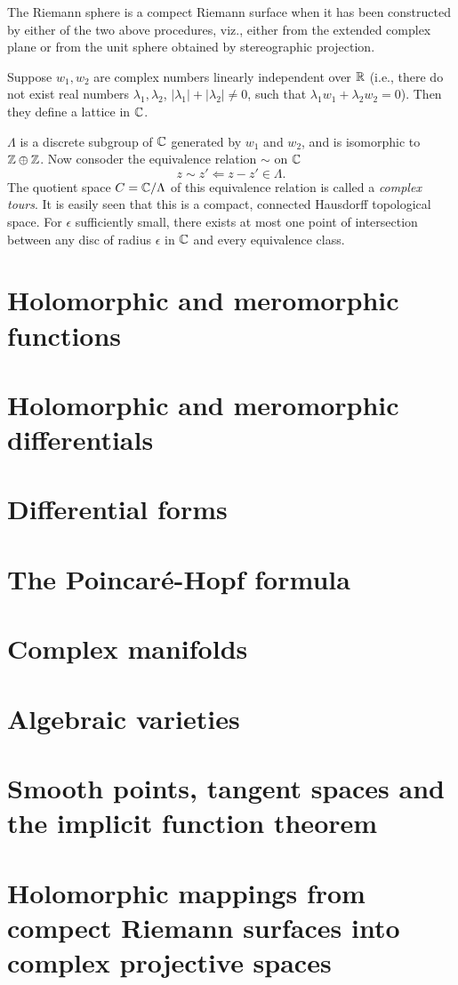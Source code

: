 \begin{example}[The set of extended complex numbers $\Sigma=\C\cup\{\infty\}$ (one point compactification of complex numbers)]
    The Riemann sphere is a compect Riemann surface when it has been constructed by either of the two above procedures, viz., either from the extended complex plane or from the unit sphere obtained by stereographic projection. 
\end{example}
\begin{example}
    Suppose $w_1,w_2$ are complex numbers linearly independent over $\mathbb{R}$ (i.e., there do not exist real numbers $\lambda_1,\lambda_2$, $|\lambda_1|+|\lambda_2|\neq0$, such that $\lambda_1w_1+\lambda_2w_2=0$). Then they define a lattice in $\mathbb{C}$. 

    $\Lambda$ is a discrete subgroup of $\mathbb{C}$ generated by $w_1$ and $w_2$, and is isomorphic to $\mathbb{Z}\oplus\mathbb{Z}$. Now consoder the equivalence relation $\sim$ on $\mathbb{C}$ 
    \[z\sim z'\Leftarrow z-z'\in\Lambda. \]
    The quotient space $C=\mathbb{C}/\Lambda$ of this equivalence relation is called a \textit{complex tours}. It is easily seen that this is a compact, connected Hausdorff topological space. For $\epsilon$ sufficiently small, there exists at most one point of intersection between any disc of radius $\epsilon$ in $\mathbb{C}$ and every equivalence class. 
\end{example}

\section{Holomorphic and meromorphic functions}\label{s1-3}

\section{Holomorphic and meromorphic differentials}\label{s1-4}

\section{Differential forms}\label{s1-5}

\section{The Poincar\'e-Hopf formula}\label{s1-6}

\section{Complex manifolds}\label{s1-7}

\section{Algebraic varieties}\label{s1-8}

\section{Smooth points, tangent spaces and the implicit function theorem}\label{s1-9}

\section{Holomorphic mappings from compect Riemann surfaces into complex projective spaces}\label{s1-10}
